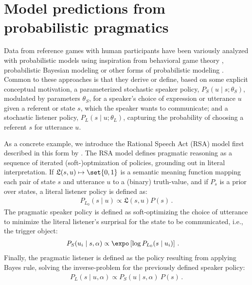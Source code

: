 \documentclass[fleqn]{article}
\begin{document}
\section{Model predictions from probabilistic pragmatics}
\label{sec:model-pred-from}

Data from reference games with human participants have been variously analyzed with probabilistic models using inspiration from behavioral game theory \citep[e.g.,][]{DegenFranke2013:Cost-Based-Prag}, probabilistic Bayesian modeling \citep[e.g.,][]{FrankGoodman2012:Predicting-Prag} or other forms of probabilistic modeling \citep[e.g.,][]{GattGompel2013:Are-we-Bayesian}.
Common to these approaches is that they derive or define, based on some explicit conceptual motivation, a parameterized stochastic speaker policy, $P_{S}(u \mid s; \theta_{S})$, modulated by parameters $\theta_{S}$, for a speaker's choice of expression or utterance $u$ given a referent or state $s$, which the speaker wants to communicate;
and a stochastic listener policy, $P_{L}(s \mid u; \theta_{L})$, capturing the probability of choosing a referent $s$ for utterance $u$.

As a concrete example, we introduce the Rational Speech Act (RSA) model first described in this form by \citet{FrankGoodman2012:Predicting-Prag} \citep[for overview see][]{FrankeJager2015:Probabilistic-p,GoodmanFrank2016:Pragmatic-Langu,StevensBenz2018:Game-Theoretic-,ScontrasTessler2021:A-practical-int,Degen2023:The-Rational-Sp}.
The RSA model defines pragmatic reasoning as a sequence of iterated (soft-)optmization of policies, grounding out in literal interpretation.
If $\mathfrak{L}(s,u) \mapsto \set{0,1}$ is a semantic meaning function mapping each pair of state $s$ and utterance $u$ to a (binary) truth-value, and if $P_{s}$ is a prior over states, a literal listener policy is defined as:
%
\begin{align*}
 P_{L_{0}}(s \mid u) \propto \mathfrak{L}(s,u) P(s)\,.
\end{align*}
%
The pragmatic speaker policy is defined as soft-optimizing the choice of utterance to minimize the literal listener's surprisal for the state to be communicated, i.e., the trigger object:
%
\begin{align*}
  P_{S}(u_{i} \mid s, \alpha) & \propto \expo \left [ \log P_{L_{0}}(s \mid u_{i}) \right ] \,.
\end{align*}
%
Finally, the pragmatic listener is defined as the policy resulting from applying Bayes rule, solving the inverse-problem for the previously defined speaker policy:
%
\begin{align*}
  P_{L}(s \mid u, \alpha) \propto  P_{S}(u \mid s, \alpha) \  P(s) \,.
\end{align*}
\end{document}
